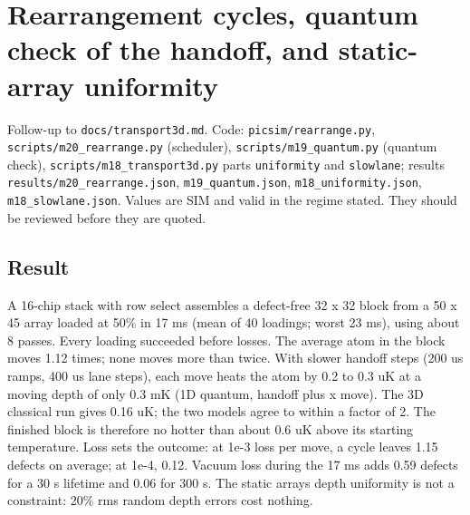 \hypertarget{rearrangement-cycles-quantum-check-of-the-handoff-and-static-array-uniformity}{%
\chapter{Rearrangement cycles, quantum check of the handoff, and
static-array
uniformity}\label{rearrangement-rearrangement-cycles-quantum-check-of-the-handoff-and-static-array-uniformity}}

Follow-up to \texttt{docs/transport3d.md}. Code:
\texttt{picsim/rearrange.py}, \texttt{scripts/m20\_rearrange.py}
(scheduler), \texttt{scripts/m19\_quantum.py} (quantum check),
\texttt{scripts/m18\_transport3d.py} parts \texttt{uniformity} and
\texttt{slowlane}; results \texttt{results/m20\_rearrange.json},
\texttt{m19\_quantum.json}, \texttt{m18\_uniformity.json},
\texttt{m18\_slowlane.json}. Values are SIM and valid in the regime
stated. They should be reviewed before they are quoted.

\hypertarget{1-result}{%
\section{Result}\label{rearrangement-1-result}}

A 16-chip stack with row select assembles a defect-free 32 x 32 block
from a 50 x 45 array loaded at 50\% in 17 ms (mean of 40 loadings; worst
23 ms), using about 8 passes. Every loading succeeded before losses. The
average atom in the block moves 1.12 times; none moves more than twice.
With slower handoff steps (200 us ramps, 400 us lane steps), each move
heats the atom by 0.2 to 0.3 uK at a moving depth of only 0.3 mK (1D
quantum, handoff plus x move). The 3D classical run gives 0.16 uK; the
two models agree to within a factor of 2. The finished block is
therefore no hotter than about 0.6 uK above its starting temperature.
Loss sets the outcome: at 1e-3 loss per move, a cycle leaves 1.15
defects on average; at 1e-4, 0.12. Vacuum loss during the 17 ms adds
0.59 defects for a 30 s lifetime and 0.06 for 300 s. The static
array\textquotesingle s depth uniformity is not a constraint: 20\% rms
random depth errors cost nothing.

